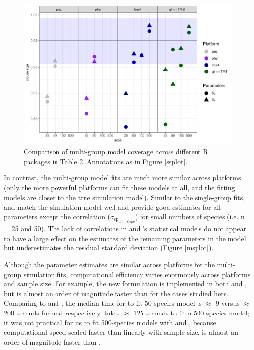 \documentclass[12pt]{article}
\begin{document}
\begin{center}
\begin{figure}[H]
  \includegraphics[scale=0.8]{./figure/mscoverage.pdf}
  \caption{Comparison of multi-group model coverage across different R packages in Table 2. Annotations as in Figure \ref{ssplot}.}
  \label{msplot_coverage}
\end{figure}
\end{center}


In contrast, the multi-group model fits are much more similar across platforms (only the more powerful platforms can fit these models at all, and the fitting models are closer to the true simulation model).
Similar to the single-group fits,  and  match the simulation model well and provide good estimates for all parameters except the correlation ($\sigma_{\mathrm{sp_{int-slope}}}$) for small numbers of species (i.e. n = 25 and 50).
The lack of correlations in  and 's statistical models do not appear to have a large effect on the estimates of the remaining parameters in the model but underestimates the residual standard deviation (Figure \ref{msplot}).

Although the parameter estimates are similar across platforms for the multi-group simulation fits, computational efficiency varies enormously across platforms and sample size.
For example, the new formulation is implemented in both  and , but  is almost an order of magnitude faster than  for the cases studied here.
Comparing  to  and , the median time for  to fit 50 species model is $\approx$ 9 versus $\approx$ 200 seconds for  and  respectively. 
 takes $\approx$ 125 seconds to fit a 500-species model; it was not practical for us to fit 500-species models with  and , because computational speed scaled faster than linearly with sample size.
 is almost an order of magnitude faster than .
\end{document}
